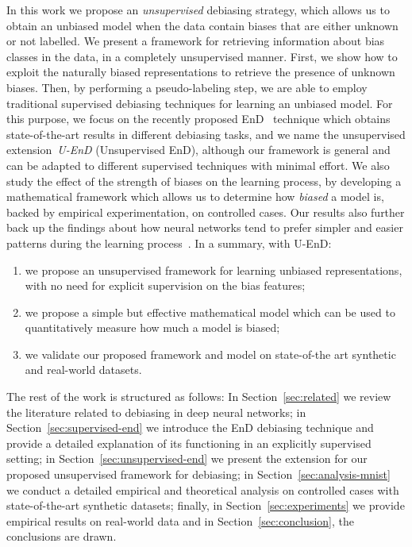 In this work we propose an \emph{unsupervised} debiasing strategy, which allows us to obtain an unbiased model when the data contain biases that are either unknown or not labelled. 
We present a framework for retrieving information about bias classes in the data, in a completely unsupervised manner. First, we show how to exploit the naturally biased representations to retrieve the presence of unknown biases. 
Then, by performing a pseudo-labeling step, we are able to employ traditional supervised debiasing techniques for learning an unbiased model. For this purpose, we focus on the recently proposed EnD~\cite{tartaglione2021end} technique which obtains state-of-the-art results in different debiasing tasks, and we name the unsupervised extension~\emph{U-EnD} (Unsupervised EnD), although our framework is general and can be adapted to different supervised techniques with minimal effort. 
We also study the effect of the strength of biases on the learning process, by developing a mathematical framework which allows us to determine how \emph{biased} a model is, backed by empirical experimentation, on controlled cases.
Our results also further back up the findings about how neural networks tend to prefer simpler and easier patterns during the learning process~\cite{arpit2017memorization,nam2020learning}.
In a summary, with U-EnD:
\begin{enumerate}
    \item we propose an unsupervised framework for learning unbiased representations, with no need for explicit supervision on the bias features;
    \item we propose a simple but effective mathematical model which can be used to quantitatively measure how much a model is biased;
    \item we validate our proposed framework and model on state-of-the art synthetic and real-world datasets.
\end{enumerate}

The rest of the work is structured as follows: In Section~\ref{sec:related} we review the literature related to debiasing in deep neural networks; in Section~\ref{sec:supervised-end} we introduce the EnD debiasing technique and provide a detailed explanation of its functioning in an explicitly supervised setting; in Section~\ref{sec:unsupervised-end} we present the extension for our proposed unsupervised framework for debiasing; in Section~\ref{sec:analysis-mnist} we conduct a detailed empirical and theoretical analysis on controlled cases with state-of-the-art synthetic datasets; finally, in Section~\ref{sec:experiments} we provide empirical results on real-world data and in Section~\ref{sec:conclusion}, the conclusions are drawn.

